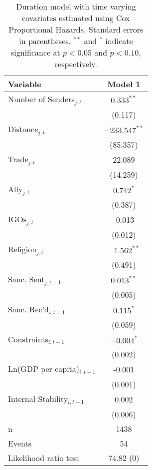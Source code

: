 \begin{table}[ht]
\centering
{\normalsize
\begin{tabular}{lc}
 Variable & Model 1 \\ 
  \hline
\hline
Number of Senders$_{j,t}$ & $0.333^{\ast\ast}$ \\ 
   & (0.117) \\ 
  Distance$_{j,t}$ & $-233.547^{\ast\ast}$ \\ 
   & (85.357) \\ 
  Trade$_{j,t}$ & 22.089 \\ 
   & (14.259) \\ 
  Ally$_{j,t}$ & $0.742^{\ast}$ \\ 
   & (0.387) \\ 
  IGOs$_{j,t}$ & -0.013 \\ 
   & (0.012) \\ 
  Religion$_{j,t}$ & $-1.562^{\ast\ast}$ \\ 
   & (0.491) \\ 
   \hline
Sanc. Sent$_{j,t-1}$ & $0.013^{\ast\ast}$ \\ 
   & (0.005) \\ 
  Sanc. Rec'd$_{i,t-1}$ & $0.115^{\ast}$ \\ 
   & (0.059) \\ 
   \hline
Constraints$_{i,t-1}$ & $-0.004^{\ast}$ \\ 
   & (0.002) \\ 
  Ln(GDP per capita)$_{i,t-1}$ & -0.001 \\ 
   & (0.001) \\ 
  Internal Stability$_{i,t-1}$ & 0.002 \\ 
   & (0.006) \\ 
   \hline
n & 1438 \\ 
  Events & 54 \\ 
  Likelihood ratio test & 74.82 (0) \\ 
   \hline
\hline
\end{tabular}
}
\caption{Duration model with time varying covariates estimated using Cox Proportional Hazards. Standard errors in parentheses. $^{**}$ and $^{*}$ indicate significance at $p< 0.05 $ and $p< 0.10 $, respectively.} 
\end{table}
